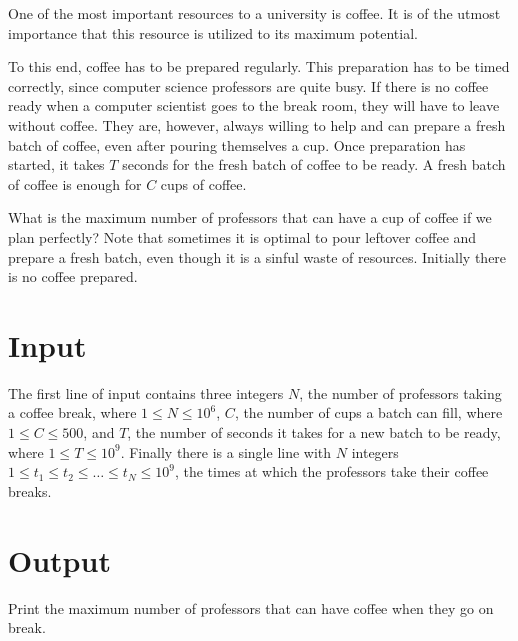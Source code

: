 
One of the most important resources to a university is coffee.
It is of the utmost importance that this resource is utilized to its maximum potential.

To this end, coffee has to be prepared regularly.
This preparation has to be timed correctly, since computer science professors are quite busy.
If there is no coffee ready when a computer scientist goes to the break room, they will have to leave without coffee.
They are, however, always willing to help and can prepare a fresh batch of coffee, even after pouring themselves a cup.
Once preparation has started, it takes $T$ seconds for the fresh batch of coffee to be ready.
A fresh batch of coffee is enough for $C$ cups of coffee.

What is the maximum number of professors that can have a cup of coffee if we plan perfectly?
Note that sometimes it is optimal to pour leftover coffee and prepare a fresh batch, even though it is a sinful waste of resources.
Initially there is no coffee prepared.

\section*{Input}
The first line of input contains three integers $N$,
the number of professors taking a coffee break,
where $1 \leq N \leq 10^6$, $C$,
the number of cups a batch can fill,
where $1 \leq C \leq 500$, and $T$,
the number of seconds it takes for a new batch to be ready,
where $1 \leq T \leq 10^9$.
Finally there is a single line with $N$ integers $1 \leq t_1 \leq t_2 \leq \dots \leq t_N \leq 10^9$, the times at which the professors
take their coffee breaks.

\section*{Output}
Print the maximum number of professors that can have coffee when they go on break.

